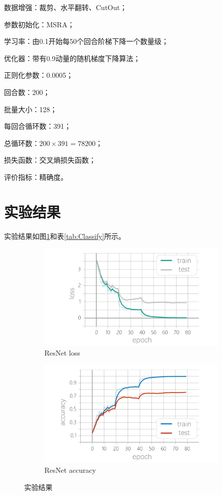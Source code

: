 \documentclass[12pt]{article}
\begin{document}
数据增强：裁剪、水平翻转、CutOut；

参数初始化：MSRA；

学习率：由0.1开始每50个回合阶梯下降一个数量级；

优化器：带有0.9动量的随机梯度下降算法；

正则化参数：0.0005；

回合数：200；

批量大小：128；

每回合循环数：391；

总循环数：$ 200 \times 391 = 78200 $；

损失函数：交叉熵损失函数；

评价指标：精确度。

\section{实验结果}

实验结果如图\ref{fig:Classify}和表\ref{tab:Classify}所示。

\begin{figure}[h]
	\begin{subfigure}{0.5\textwidth}
		\includegraphics[width=\linewidth]
		{plot/ResNet/loss.png}
		\caption{ResNet loss}
	\end{subfigure}
	\begin{subfigure}{0.5\textwidth}
		\includegraphics[width=\linewidth]
		{plot/ResNet/top1.png}
		\caption{ResNet accuracy}
	\end{subfigure}
	\caption{实验结果}
	\label{fig:Classify}
\end{figure}
\end{document}
